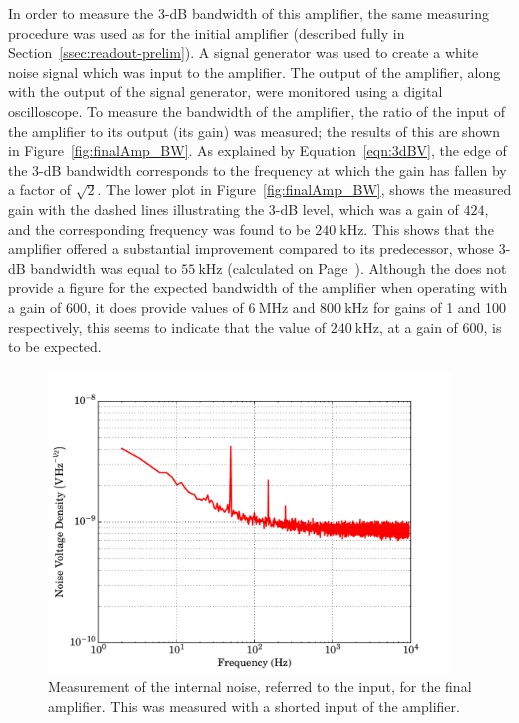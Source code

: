 In order to measure the 3-dB bandwidth of this amplifier, the same measuring procedure was used as for the initial amplifier (described fully in Section~\ref{ssec:readout-prelim}). A signal generator was used to create a white noise signal which was input to the amplifier. The output of the amplifier, along with the output of the signal generator, were monitored using a digital oscilloscope. To measure the bandwidth of the amplifier, the ratio of the input of the amplifier to its output (its gain) was measured; the results of this are shown in Figure~\ref{fig:finalAmp_BW}. As explained by Equation~\ref{eqn:3dBV}, the edge of the 3-dB bandwidth corresponds to the frequency at which the gain has fallen by a factor of $\sqrt{2}$. The lower plot in Figure~\ref{fig:finalAmp_BW}, shows the measured gain with the dashed lines illustrating the 3-dB level, which was a gain of $424$, and the corresponding frequency was found to be $240~\mathrm{kHz}$\label{res:final_amp_BW}. This shows that the amplifier offered a substantial improvement compared to its predecessor, whose 3-dB bandwidth was equal to $55~\mathrm{kHz}$ (calculated on Page~\pageref{res:RTD_amp_BW}). Although the \textcite{INA103DS} does not provide a figure for the expected bandwidth of the amplifier when operating with a gain of 600, it does provide values of $6~\mathrm{MHz}$ and $800~\mathrm{kHz}$ for gains of 1 and 100 respectively, this seems to indicate that the value of $240~\mathrm{kHz}$, at a gain of 600, is to be expected.
\begin{figure}[t]
\begin{center}
\includegraphics[width = 0.95\textwidth]{figures/final_amp_IRN}
\caption[Measurement of the internal noise, referred to the input, for the final amplifier.]{Measurement of the internal noise, referred to the input, for the final amplifier. This was measured with a shorted input of the amplifier.}
\label{fig:finalAmp_IRN}
\end{center}
\end{figure}
